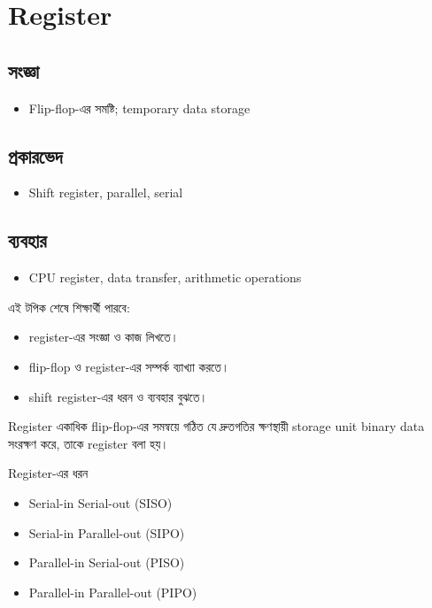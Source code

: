 \section{Register}

\subsection{সংজ্ঞা}
\begin{itemize}
\item Flip-flop-এর সমষ্টি; temporary data storage
\end{itemize}

\subsection{প্রকারভেদ}
\begin{itemize}
\item Shift register, parallel, serial
\end{itemize}

\subsection{ব্যবহার}
\begin{itemize}
\item CPU register, data transfer, arithmetic operations
\end{itemize}

\begin{learningbox}
এই টপিক শেষে শিক্ষার্থী পারবে:
\begin{itemize}
\item register-এর সংজ্ঞা ও কাজ লিখতে।
\item flip-flop ও register-এর সম্পর্ক ব্যাখ্যা করতে।
\item shift register-এর ধরন ও ব্যবহার বুঝতে।
\end{itemize}
\end{learningbox}

\begin{definitionbox}{Register}
একাধিক flip-flop-এর সমন্বয়ে গঠিত যে দ্রুতগতির ক্ষণস্থায়ী storage unit binary data সংরক্ষণ করে, তাকে register বলা হয়।
\end{definitionbox}

\begin{keypointbox}{Register-এর ধরন}
\begin{itemize}
\item Serial-in Serial-out (SISO)
\item Serial-in Parallel-out (SIPO)
\item Parallel-in Serial-out (PISO)
\item Parallel-in Parallel-out (PIPO)
\end{itemize}
\end{keypointbox}

